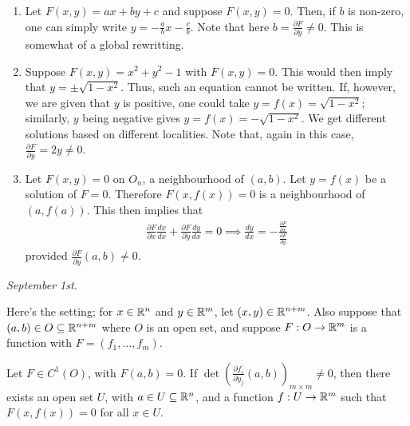 \begin{example}
    \begin{enumerate}
        \item Let $F(x,y) = ax+by+c$ and suppose $F(x,y) = 0$. Then, if $b$ is non-zero, one can simply write $y = -\frac{a}{b}x - \frac{c}{b}$. Note that here $b = \frac{\partial F}{\partial y} \neq 0$. This is somewhat of a global rewritting.
        \item Suppose $F(x,y) = x^{2}+y^{2}-1$ with $F(x,y) = 0$. This would then imply that $y = \pm \sqrt{1-x^{2}}$. Thus, such an equation cannot be written. If, however, we are given that $y$ is positive, one could take $y = f(x) = \sqrt{1-x^{2}}$; similarly, $y$ being negative gives $y = f(x) = -\sqrt{1-x^{2}}$. We get different solutions based on different localities. Note that, again in this case, $\frac{\partial F}{\partial y} = 2y \neq 0$.
        
        \item Let $F(x,y) = 0$ on $O_{n}$, a neighbourhood of $(a,b)$. Let $y = f(x)$ be a solution of $F = 0$. Therefore $F(x,f(x)) = 0$ is a neighbourhood of $(a,f(a))$. This then implies that
        \begin{align}
            \frac{\partial F}{\partial x} \frac{dx}{dx} + \frac{\partial F}{\partial y} \frac{dy}{dx} = 0 \implies \frac{dy}{dx} = -\frac{\frac{\partial F}{\partial x}}{\frac{\partial F}{\partial y}}
        \end{align}
        provided $\frac{\partial F}{\partial y}(a,b) \neq 0$.
    \end{enumerate}
\end{example}
\textit{September 1st.}

Here's the setting; for $x \in \mathbb{R}^{n}$ and $y \in \mathbb{R}^{m}$, let $(x,y) \in \mathbb{R}^{n+m}$. Also suppose that $(a,b) \in O \subseteq \mathbb{R}^{n+m}$ where $O$ is an open set, and suppose $F:O \to \mathbb{R}^{m}$ is a function with $F = (f_{1},\ldots,f_{m})$.

\begin{theorem}
    Let $F \in C^{1}(O)$, with $F(a,b) = 0$. If $\det \left( \frac{\partial f_{i}}{\partial y_{j}}(a,b) \right)_{m \times m} \neq 0$, then there exists an open set $U$, with $a \in U \subseteq \mathbb{R}^{n}$, and a function $f:U \to \mathbb{R}^{m}$ such that $F(x,f(x)) = 0$ for all $x \in U$.
\end{theorem}

